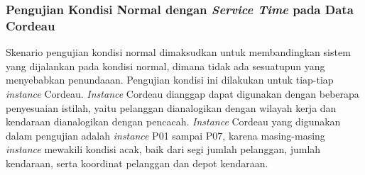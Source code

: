 \subsubsection{Pengujian Kondisi Normal dengan \textit{Service Time} pada Data Cordeau}
\label{ssec:test-normal-service-time-cordeau}
Skenario pengujian kondisi normal dimaksudkan untuk membandingkan sistem yang dijalankan pada kondisi normal, dimana tidak ada sesuatupun yang menyebabkan penundaaan. Pengujian kondisi ini dilakukan untuk tiap-tiap \textit{instance} Cordeau. \textit{Instance} Cordeau dianggap dapat digunakan dengan beberapa penyesuaian istilah, yaitu pelanggan dianalogikan dengan wilayah kerja dan kendaraan dianalogikan dengan pencacah. \textit{Instance} Cordeau yang digunakan dalam pengujian adalah \textit{instance} P01 sampai P07, karena masing-masing \textit{instance} mewakili kondisi acak, baik dari segi jumlah pelanggan, jumlah kendaraan, serta koordinat pelanggan dan depot kendaraan.


